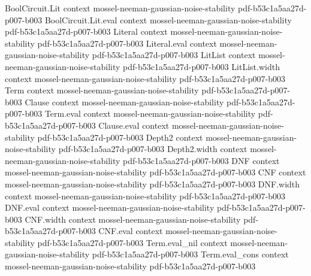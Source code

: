 \begin{theorem}
\label{BooleanAnalysis.GaussianSpace.gaussianGenerator_integration_by_parts}
\leanok
{}
\proofstep
  {BoolCircuit.Lit}
  {context}
  {mossel-neeman-gaussian-noise-stability}
  {pdf-b53c1a5aa27d-p007-b003}
\proofstep
  {BoolCircuit.Lit.eval}
  {context}
  {mossel-neeman-gaussian-noise-stability}
  {pdf-b53c1a5aa27d-p007-b003}
\proofstep
  {Literal}
  {context}
  {mossel-neeman-gaussian-noise-stability}
  {pdf-b53c1a5aa27d-p007-b003}
\proofstep
  {Literal.eval}
  {context}
  {mossel-neeman-gaussian-noise-stability}
  {pdf-b53c1a5aa27d-p007-b003}
\proofstep
  {LitList}
  {context}
  {mossel-neeman-gaussian-noise-stability}
  {pdf-b53c1a5aa27d-p007-b003}
\proofstep
  {LitList.width}
  {context}
  {mossel-neeman-gaussian-noise-stability}
  {pdf-b53c1a5aa27d-p007-b003}
\proofstep
  {Term}
  {context}
  {mossel-neeman-gaussian-noise-stability}
  {pdf-b53c1a5aa27d-p007-b003}
\proofstep
  {Clause}
  {context}
  {mossel-neeman-gaussian-noise-stability}
  {pdf-b53c1a5aa27d-p007-b003}
\proofstep
  {Term.eval}
  {context}
  {mossel-neeman-gaussian-noise-stability}
  {pdf-b53c1a5aa27d-p007-b003}
\proofstep
  {Clause.eval}
  {context}
  {mossel-neeman-gaussian-noise-stability}
  {pdf-b53c1a5aa27d-p007-b003}
\proofstep
  {Depth2}
  {context}
  {mossel-neeman-gaussian-noise-stability}
  {pdf-b53c1a5aa27d-p007-b003}
\proofstep
  {Depth2.width}
  {context}
  {mossel-neeman-gaussian-noise-stability}
  {pdf-b53c1a5aa27d-p007-b003}
\proofstep
  {DNF}
  {context}
  {mossel-neeman-gaussian-noise-stability}
  {pdf-b53c1a5aa27d-p007-b003}
\proofstep
  {CNF}
  {context}
  {mossel-neeman-gaussian-noise-stability}
  {pdf-b53c1a5aa27d-p007-b003}
\proofstep
  {DNF.width}
  {context}
  {mossel-neeman-gaussian-noise-stability}
  {pdf-b53c1a5aa27d-p007-b003}
\proofstep
  {DNF.eval}
  {context}
  {mossel-neeman-gaussian-noise-stability}
  {pdf-b53c1a5aa27d-p007-b003}
\proofstep
  {CNF.width}
  {context}
  {mossel-neeman-gaussian-noise-stability}
  {pdf-b53c1a5aa27d-p007-b003}
\proofstep
  {CNF.eval}
  {context}
  {mossel-neeman-gaussian-noise-stability}
  {pdf-b53c1a5aa27d-p007-b003}
\proofstep
  {Term.eval_nil}
  {context}
  {mossel-neeman-gaussian-noise-stability}
  {pdf-b53c1a5aa27d-p007-b003}
\proofstep
  {Term.eval_cons}
  {context}
  {mossel-neeman-gaussian-noise-stability}
  {pdf-b53c1a5aa27d-p007-b003}

\end{theorem}
